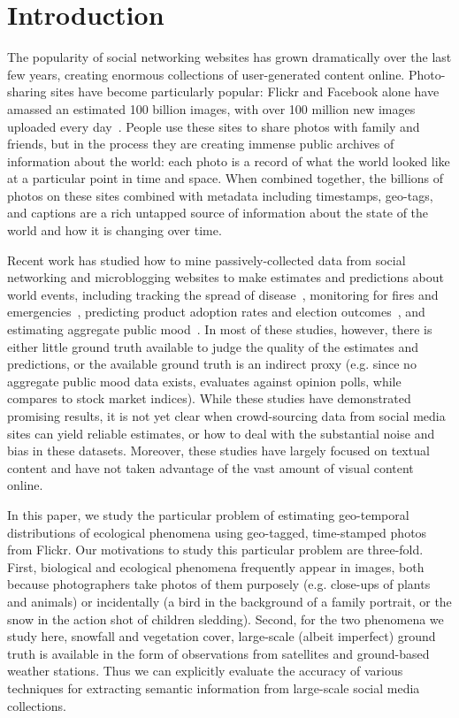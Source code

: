 \section{Introduction}

The popularity of social networking websites has grown dramatically
over the last few years, creating enormous collections of
user-generated content online. Photo-sharing sites have become
particularly popular: Flickr and Facebook alone have amassed an
estimated 100 billion images, with over 100 million new images
uploaded every day~\cite{Kremerskothen11}.  People use these
sites to share photos with family and friends, but in the process they
are creating immense public archives of information about the world:
each photo is a record of what the world looked like at a particular
point in time and space.  When combined together, the billions of
photos on these sites combined with metadata including timestamps,
geo-tags, and captions are a rich untapped source of information about
the state of the world and how it is changing over
time.

Recent work has studied how to mine passively-collected data
from social networking and microblogging websites to make estimates
and predictions about world events, including tracking the spread of
disease~\cite{ginsberg09flu}, monitoring for fires and
emergencies~\cite{delongueville09}, predicting product adoption rates
and election outcomes~\cite{jin10prediction}, and estimating aggregate
public mood~\cite{oconnor10mood,bollen11twitter}. In most of these
studies, however, there is either little ground truth available to
judge the quality of the estimates and predictions, or the available
ground truth is an indirect proxy (e.g. since no aggregate public mood
data exists, \cite{oconnor10mood} evaluates against opinion polls,
while~\cite{bollen11twitter} compares to stock market indices).  While
these studies have demonstrated promising results, it is not yet clear
when crowd-sourcing data from social media sites can yield reliable
estimates, or how to deal with the substantial noise and bias in these
datasets. Moreover, these studies have largely focused on textual
content and have not taken advantage of the vast amount of visual
content online.

In this paper, we study the particular problem of estimating
geo-temporal distributions of ecological phenomena using geo-tagged,
time-stamped photos from Flickr.  Our motivations to study this
particular problem are three-fold.  First, biological and ecological
phenomena frequently appear in images, both because photographers take
photos of them purposely (e.g. close-ups of plants and animals) or
incidentally (a bird in the background of a family portrait, or the
snow in the action shot of children sledding).  Second, for the two
phenomena we study here, snowfall and vegetation cover, large-scale
(albeit imperfect) ground truth is available in the form of
observations from satellites and ground-based weather stations.  Thus
we can explicitly evaluate the accuracy of various techniques for
extracting semantic information from large-scale social media
collections.

